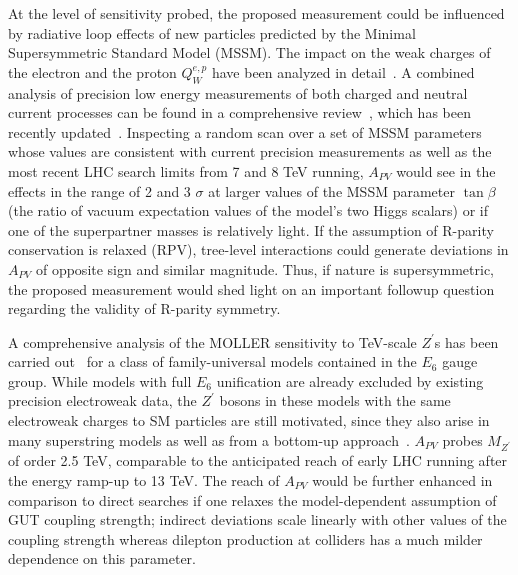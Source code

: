 At the level of sensitivity probed, the proposed measurement could be influenced by radiative loop effects of new 
particles predicted by the Minimal Supersymmetric Standard Model (MSSM). The impact on the weak charges of the
electron and the proton $Q_W^{e,p}$ have been analyzed in detail~\cite{ref:cl:Kurylov:2003zh}. A combined analysis of 
precision low energy measurements of both charged and neutral current processes can be found in a comprehensive review~\cite{ref:cl:RamseyMusolf:2006vr}, which has been recently updated~\cite{ref:cl:Erler:2013xha}. 
Inspecting a random scan over a set of MSSM parameters whose values are consistent with current precision 
measurements as well as the most recent LHC search limits from 7 and 8 TeV running, $A_{PV}$ would see 
in the effects in the range of 2 and 3 $\sigma$ at larger values of the MSSM parameter $\tan\beta$ (the ratio of vacuum expectation values of the model's two Higgs scalars) or if one of the superpartner 
masses is relatively light. 
If the assumption of R-parity conservation is relaxed (RPV), tree-level interactions could generate deviations 
in $A_{PV}$ of opposite sign and similar magnitude. Thus, if nature is supersymmetric, the proposed measurement
would shed light on an important followup question regarding the validity of R-parity symmetry.

A comprehensive analysis of the MOLLER sensitivity to 
TeV-scale $Z^\prime$s has been carried out~\cite{ref:cl:Erler:2011iw} 
for a class of family-universal models
contained in the $E_6$ gauge group.  While models with full $E_6$ unification are already
excluded by existing precision electroweak data, the $Z^\prime$ bosons in these models with the same electroweak charges to SM particles are still motivated, since 
they also arise in many superstring models as well as from a bottom-up approach~\cite{ref:cl:Erler:2000wu}. 
$A_{PV}$ probes
 $M_{Z^\prime} $ of order 2.5 TeV, comparable to the anticipated reach of 
early LHC running after the energy ramp-up to 13 TeV. The reach of $A_{PV}$ would be further 
enhanced in comparison 
to direct searches if one relaxes the model-dependent assumption of GUT coupling strength; indirect 
deviations scale linearly with other values of the coupling strength whereas dilepton production at colliders
has a much milder dependence on this parameter. 



